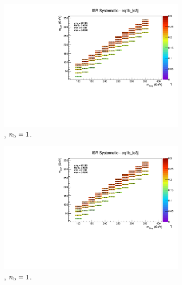 \begin{figure}[ht!]
\begin{subfigure}[b]{0.32\textwidth}
    \includegraphics[width=\textwidth, page=8]{Figs/sms/t2cc/v37/systs/T2cc_ISR_eq1b_le3j.pdf}
    \caption{\njlow, $n_{\text{b}} = 1$.}
  \end{subfigure}
  \begin{subfigure}[b]{0.32\textwidth}
    \includegraphics[width=\textwidth, page=1]{Figs/sms/t2cc/v37/systs/T2cc_ISR_eq1b_le3j.pdf}
    \caption{\njlow, $n_{\text{b}} = 1$.}
  \end{subfigure}\\
  \begin{subfigure}[b]{0.32\textwidth}

\end{subfigure}
\end{figure}
